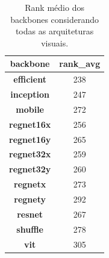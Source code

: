 \begin{table}
\centering
\caption{Rank médio dos backbones considerando todas as arquiteturas visuais.}
\label{tab:rankingbackbone}
\begin{tabular}{|>{\bfseries}c|c|}
\toprule
 backbone &  rank\_avg \\
\midrule
efficient &       238 \\
inception &       247 \\
   mobile &       272 \\
regnet16x &       256 \\
regnet16y &       265 \\
regnet32x &       259 \\
regnet32y &       260 \\
  regnetx &       273 \\
  regnety &       292 \\
   resnet &       267 \\
  shuffle &       278 \\
      vit &       305 \\
\bottomrule
\end{tabular}
\end{table}

